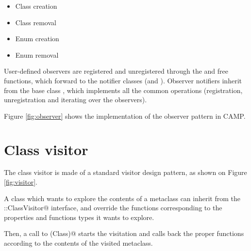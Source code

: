 \documentclass[a4paper, twoside]{report}
\begin{document}
	\begin{itemize}
		\item Class creation
		\item Class removal
		\item Enum creation
		\item Enum removal
	\end{itemize}
	
	User-defined observers are registered and unregistered through the \verb@addObserver@ and \verb@removeObserver@ free functions,
	which forward to the notifier classes (\verb@ClassManager@ and \verb@EnumManager@). Observer notifiers inherit from the base
	class \verb@ObserverNotifier@, which implements all the common operations (registration, unregistration and iterating over the observers).
	
	Figure \ref{fig:observer} shows the implementation of the observer pattern in CAMP.


\chapter{Class visitor}

	The class visitor is made of a standard visitor design pattern, as shown on Figure \ref{fig:visitor}.
	
	A class which wants to explore the contents of a metaclass can inherit from the \verb@camp::ClassVisitor@ interface, and
	override the \verb@visit@ functions corresponding to the properties and functions types it wants to explore.
	
	Then, a call to \verb@visit(Class)@ starts the visitation and calls back the proper \verb@visit@ functions according to
	the contents of the visited metaclass.


\newpage

\listoffigures
\end{document}
